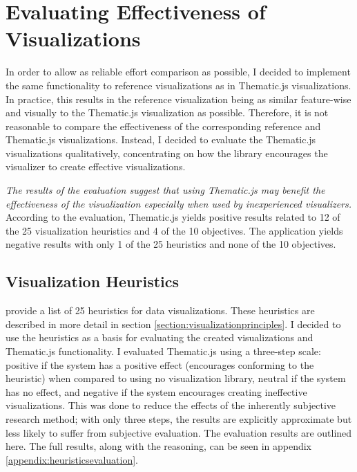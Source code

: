 \section{Evaluating Effectiveness of Visualizations}
\label{section:evaluatingeffectiveness}

In order to allow as reliable effort comparison as possible, I decided to implement the same functionality to reference visualizations as in Thematic.js visualizations. In practice, this results in the reference visualization being as similar feature-wise and visually to the Thematic.js visualization as possible. Therefore, it is not reasonable to compare the effectiveness of the corresponding reference and Thematic.js visualizations. Instead, I decided to evaluate the Thematic.js visualizations qualitatively, concentrating on how the library encourages the visualizer to create effective visualizations.

\emph{The results of the evaluation suggest that using Thematic.js may benefit the effectiveness of the visualization especially when used by inexperienced visualizers.} According to the evaluation, Thematic.js yields positive results related to 12 of the 25 visualization heuristics and 4 of the 10 objectives. The application yields negative results with only 1 of the 25 heuristics and none of the 10 objectives.

\subsection{Visualization Heuristics}

\citet{zuk_heuristics_2006} provide a list of 25 heuristics for data visualizations. These heuristics are described in more detail in section \ref{section:visualizationprinciples}. I decided to use the heuristics as a basis for evaluating the created visualizations and Thematic.js functionality. I evaluated Thematic.js using a three-step scale: positive if the system has a positive effect (encourages conforming to the heuristic) when compared to using no visualization library, neutral if the system has no effect, and negative if the system encourages creating ineffective visualizations. This was done to reduce the effects of the inherently subjective research method; with only three steps, the results are explicitly approximate but less likely to suffer from subjective evaluation. The evaluation results are outlined here. The full results, along with the reasoning, can be seen in appendix \ref{appendix:heuristicsevaluation}.

